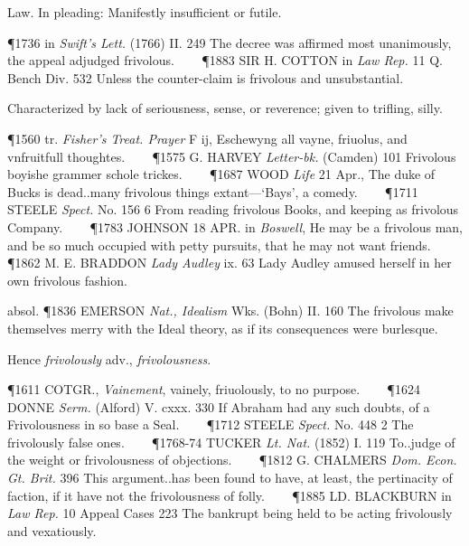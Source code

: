 \begin{description}[wide, labelwidth=!, labelindent=0pt]
\begin{myenumerate}
 Law. In pleading: Manifestly insufficient or futile.

\P 1736 in  \textit{Swift's Lett.} (1766) II. 249 The decree was affirmed most unanimously, the appeal adjudged frivolous.    
\P 1883 SIR H. COTTON in  \textit{Law Rep.} 11 Q. Bench Div. 532 Unless the counter-claim is frivolous and unsubstantial.

 Characterized by lack of seriousness, sense, or reverence; given to trifling, silly.

\P 1560 tr.  \textit{Fisher's Treat. Prayer} F ij, Eschewyng all vayne, friuolus, and vnfruitfull thoughtes.    
\P 1575 G. HARVEY  \textit{Letter-bk.} (Camden) 101 Frivolous boyishe grammer schole trickes.    
\P 1687 WOOD  \textit{Life} 21 Apr., The duke of Bucks is dead..many frivolous things extant—‘Bays’, a comedy.    
\P 1711 STEELE  \textit{Spect.} No. 156 6 From reading frivolous Books, and keeping as frivolous Company.    
\P 1783 JOHNSON 18 APR. in  \textit{Boswell}, He may be a frivolous man, and be so much occupied with petty pursuits, that he may not want friends.    
\P 1862 M. E. BRADDON  \textit{Lady Audley} ix. 63 Lady Audley amused herself in her own frivolous fashion.

\noindent absol. \P 1836 EMERSON  \textit{Nat., Idealism} Wks. (Bohn) II. 160 The frivolous make themselves merry with the Ideal theory, as if its consequences were burlesque.

\noindent Hence \textit{frivolously} adv., \textit{frivolousness}.

\P 1611 COTGR.,  \textit{Vainement}, vainely, friuolously, to no purpose.    
\P 1624 DONNE  \textit{Serm.} (Alford) V. cxxx. 330 If Abraham had any such doubts, of a Frivolousness in so base a Seal.    
\P 1712 STEELE  \textit{Spect.} No. 448 2 The frivolously false ones.    
\P 1768-74 TUCKER  \textit{Lt. Nat.} (1852) I. 119 To..judge of the weight or frivolousness of objections.    
\P 1812 G. CHALMERS  \textit{Dom. Econ. Gt. Brit.} 396 This argument..has been found to have, at least, the pertinacity of faction, if it have not the frivolousness of folly.    
\P 1885 LD. BLACKBURN in  \textit{Law Rep.} 10 Appeal Cases 223 The bankrupt being held to be acting frivolously and vexatiously.
\end{myenumerate}




\end{description}

